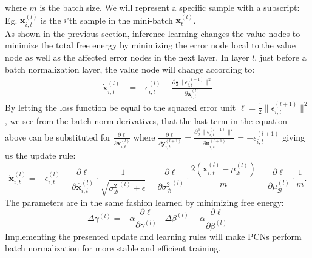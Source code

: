 \documentclass[a4paper,11pt]{article}
\begin{document}
where $m$ is the batch size. We will represent a specific sample with a subscript: Eg. $\mathbf{x}_{i,t}^{(l)}$ is the $i$'th sample in the mini-batch $\mathbf{x}_{t}^{(l)}$. 
\\
As shown in the previous section, inference learning changes the value nodes to minimize the total free energy by minimizing the error node local to the value node as well as the affected error nodes in the next layer. In layer $l$, just before a batch normalization layer, the value node will change according to:
\begin{equation}
  \begin{split}
    \dot{\mathbf{x}}_{i,t}^{(l)} &= -\epsilon_{i,t}^{(l)} - \frac{\partial \frac{1}{2}\lVert\epsilon_{i,t}^{(l+1)}\rVert^{2}}{ \partial \mathbf{x}_{i,t}^{(l)}}
  \end{split}
\end{equation}
By letting the loss function be equal to the squared error unit $\ell=\frac{1}{2}\lVert\epsilon_{i,t}^{(l+1)}\rVert^{2}$, we see from the batch norm derivatives, that the last term in the equation above can be substituted for $\frac{\partial \ell}{\partial \mathbf{x}_{i,t}^{(l)}}$ where $\frac{\partial \ell}{\partial \mathbf{y}_{i,t}^{(l+1)}} = \frac{\partial \frac{1}{2}\lVert\epsilon_{i, t}^{(l+1)}\rVert^{2}}{\partial \mathbf{u}_{i,t}^{(l+1)}} = - \epsilon_{i,t}^{(l+1)}$ giving us the update rule:
\begin{equation}
  \dot{\mathbf{x}}_{i,t}^{(l)} = -\epsilon_{i, t}^{(l)} - 
    \frac{\partial \ell}{\partial \widehat{\mathbf{x}}_{i,t}^{(l)}} \cdot \frac{1}{\sqrt{ {\sigma_{\mathcal{B}}^{2}}^{(l)} + \epsilon }} - \frac{\partial \ell}{\partial {\sigma_{\mathcal{B}}^{2}}^{(l)}} \cdot \frac{2\left(\mathbf{x}_{i,t}^{(l)}-\mu_{\mathcal{B}}^{(l)} \right)}{m}- \frac{\partial \ell}{\partial \mu_{\mathcal{B}}^{(l)}} \cdot \frac{1}{m}.
\end{equation}
The parameters are in the same fashion learned by minimizing free energy:
\begin{equation}
  \Delta \gamma^{(l)} = -\alpha \frac{\partial \ell}{\partial \gamma^{(l)}} \hspace{10pt} \Delta \beta^{(l)} -\alpha \frac{\partial \ell}{\partial \beta^{(l)}}
\end{equation}
Implementing the presented update and learning rules will make PCNs perform batch normalization for more stable and efficient training.

\newpage
\end{document}
